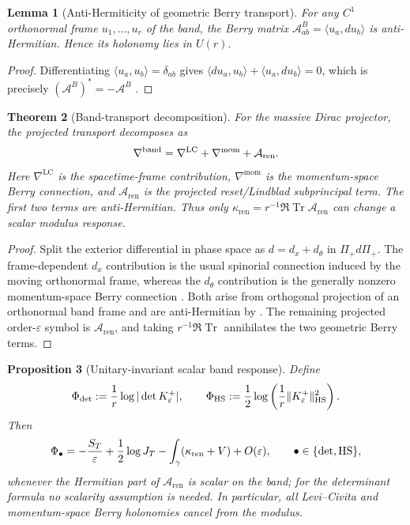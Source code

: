 \documentclass[11pt]{article}
\newtheorem{theorem}{Theorem}[section]
\newtheorem{proposition}[theorem]{Proposition}
\newtheorem{lemma}[theorem]{Lemma}
\theoremstyle{definition}
\theoremstyle{remark}
\newcommand{\eps}{\varepsilon}
\newcommand{\Tr}{\operatorname{Tr}}
\newcommand{\ren}{\mathrm{ren}}
\newcommand{\LC}{\mathrm{LC}}
\newcommand{\mom}{\mathrm{mom}}
\begin{document}
\begin{lemma}[Anti-Hermiticity of geometric Berry transport]
\label{lem:berry-antiherm}
For any $C^1$ orthonormal frame $u_1,\ldots,u_r$ of the band, the Berry matrix
$\mathcal A^{B}_{ab}=\langle u_a,du_b\rangle$ is anti-Hermitian.  Hence its
holonomy lies in $U(r)$.
\end{lemma}

\begin{proof}
Differentiating $\langle u_a,u_b\rangle=\delta_{ab}$ gives
$\langle du_a,u_b\rangle+\langle u_a,du_b\rangle=0$, which is precisely
$(\mathcal A^B)^*=-\mathcal A^B$ \cite{Berry,Simon,WilczekZee}.
\end{proof}

\begin{theorem}[Band-transport decomposition]
\label{thm:transport-decomp}
For the massive Dirac projector, the projected transport decomposes as
\[
 \nabla^{\rm band}=\nabla^{\LC}+\nabla^{\mom}+\mathcal A_{\ren}.
\]
Here $\nabla^{\LC}$ is the spacetime-frame contribution, $\nabla^{\mom}$ is the
momentum-space Berry connection, and $\mathcal A_{\ren}$ is the projected
reset/Lindblad subprincipal term.  The first two terms are anti-Hermitian.  Thus
only $\kappa_{\ren}=r^{-1}\Re\Tr\mathcal A_{\ren}$ can change a scalar modulus
response.
\end{theorem}

\begin{proof}
Split the exterior differential in phase space as $d=d_x+d_\theta$ in
$\Pi_+d\Pi_+$.  The frame-dependent $d_x$ contribution is the usual spinorial
connection induced by the moving orthonormal frame, whereas the $d_\theta$
contribution is the generally nonzero momentum-space Berry connection
\cite{LittlejohnFlynn,EmmrichWeinstein}.  Both arise from orthogonal projection of
an orthonormal band frame and are anti-Hermitian by
.  The remaining projected order-$\eps$ symbol is
$\mathcal A_{\ren}$, and taking $r^{-1}\Re\Tr$ annihilates the two geometric
Berry terms.
\end{proof}

\begin{proposition}[Unitary-invariant scalar band response]
\label{prop:invariant-response}
Define
\[
 \Phi_{\det}:=\frac1r\log|\det K^+_\eps|,
 \qquad
 \Phi_{\rm HS}:=\frac12\log\left(\frac1r\|K^+_\eps\|_{\rm HS}^2\right).
\]
Then
\[
 \Phi_\bullet=-\frac{S_T}{\eps}+\frac12\log J_T
 -\int_\gamma(\kappa_{\ren}+V)+O(\eps),
 \qquad \bullet\in\{\det,{\rm HS}\},
\]
whenever the Hermitian part of $\mathcal A_{\ren}$ is scalar on the band; for the
determinant formula no scalarity assumption is needed.  In particular, all
Levi--Civita and momentum-space Berry holonomies cancel from the modulus.
\end{proposition}
\end{document}

